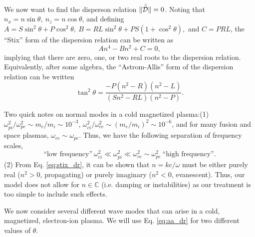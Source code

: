 	We now want to find the disperson relation $\|\bar{\bar{\mathcal{D}}}\|=0$. Noting that $n_x=n\sin{\theta},~n_z=n\cos{\theta}$, and defining $A=S\sin^2\theta+P\cos^2\theta,~B=RL\sin^2\theta+PS(1+\cos^2\theta),$ and $C=PRL$, the ``Stix'' form of the dispersion relation can be written as
	\begin{equation}
		\label{eq:stix_dr}
		An^4 - Bn^2 + C =0,
	\end{equation}
	implying that there are zero, one, or two real roots to the dispersion relation. Equivalently, after some algebra, the ``Astrom-Allis'' form of the dispersion relation can be written
	\begin{equation}
		\label{eq:aa_dr}
		\tan^2\theta = \frac{-P(n^2-R)(n^2-L)}{(Sn^2 - RL)(n^2 - P)}.
	\end{equation}

	Two quick notes on normal modes in a cold magnetized plasma:(1) $\omega_{pi}^2/\omega_{pe}^2\sim m_e/m_i\sim10^{-3}$, $\omega_{ci}^2/\omega_{ce}^2\sim(m_e/m_i)^2\sim10^{-6}$, and for many fusion and space plasmas, $\omega_{ce}\sim\omega_{pe}$. Thus, we have the following separation of frequency scales,
	\begin{equation}
		\text{``low frequency''}~\omega_{ci}^2\ll\omega_{pi}^2\ll\omega_{ce}^2\sim\omega_{pe}^2~\text{``high frequency''}.
	\end{equation}
	(2) From Eq. \ref{eq:stix_dr}, it can be shown that $n=kc/\omega$ must be either purely real ($n^2>0$, propagating) or purely imaginary ($n^2<0$, evanescent). Thus, our model does not allow for $n\in\mathbb{C}$ (i.e. damping or instabilities) as our treatment is too simple to include such effects.

	We now consider several different wave modes that can arise in a cold, magnetized, electron-ion plasma. We will use Eq. \ref{eq:aa_dr} for two different values of $\theta$.

